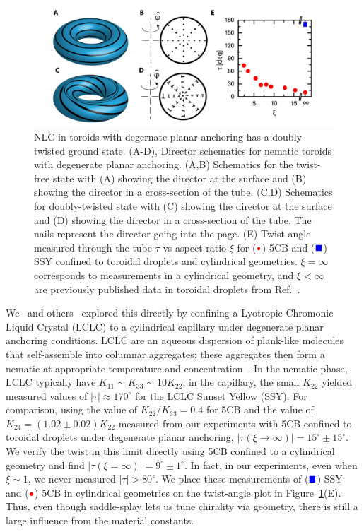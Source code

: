 \begin{figure}
  \centering
  \includegraphics{figures/C4/Ch4-Figs_PlanarTwist.png}
  \caption{NLC in toroids with degernate planar anchoring has a doubly-twisted ground state.
  (A-D), Director schematics for nematic toroids with degenerate planar anchoring.
  (A,B) Schematics for the twist-free state with (A) showing the director at the surface and (B) showing the director in a cross-section of the tube.
  (C,D) Schematics for doubly-twisted state with (C) showing the director at the surface and (D) showing the director in a cross-section of the tube.
  The nails represent the director going into the page.
  (E) Twist angle measured through the tube $\tau$ vs aspect ratio $\xi$ for (${\color{red} \bullet}$) 5CB and (${\color{blue} \blacksquare}$) SSY confined to toroidal droplets and cylindrical geometries.
  $\xi = \infty$ corresponds to measurements in a cylindrical geometry, and $\xi < \infty$ are previously published data in toroidal droplets from Ref.~\cite{RN24}.}\label{f:4-PlanarToroidsTwist}
\end{figure}

We~\cite{RN293} and others~\cite{RN191} explored this directly by confining a Lyotropic Chromonic Liquid Crystal (LCLC) to a cylindrical capillary under degenerate planar anchoring conditions.
LCLC are an aqueous dispersion of plank-like molecules that self-assemble into columnar aggregates; these aggregates then form a nematic at appropriate temperature and concentration~\cite{RN303}.
In the nematic phase, LCLC typically have $K_{11} \sim K_{33} \sim 10 K_{22}$; in the capillary, the small $K_{22}$ yielded measured values of $|\tau| \approx 170 ^{\circ}$ for the LCLC Sunset Yellow (SSY).
For comparison, using the value of $K_{22}/K_{33}=0.4$ for 5CB and the value of $K_{24} = (1.02 \pm 0.02) K_{22}$ measured from our experiments with 5CB confined to toroidal droplets under degenerate planar anchoring, $|\tau (\xi \rightarrow \infty)| = 15^{\circ} \pm 15^{\circ}$.
We verify the twist in this limit directly using 5CB confined to a cylindrical geometry and find $|\tau (\xi = \infty)| = 9^{\circ} \pm 1^{\circ}$.
In fact, in our experiments, even when $\xi \sim 1$, we never measured $|\tau| > 80^{\circ}$.
We place these measurements of (${\color{blue} \blacksquare}$) SSY and (${\color{red} \bullet}$) 5CB in cylindrical geometries on the twist-angle plot in Figure~\ref{f:4-PlanarToroidsTwist}(E).
Thus, even though saddle-splay lets us tune chirality via geometry, there is still a large influence from the material constants.

